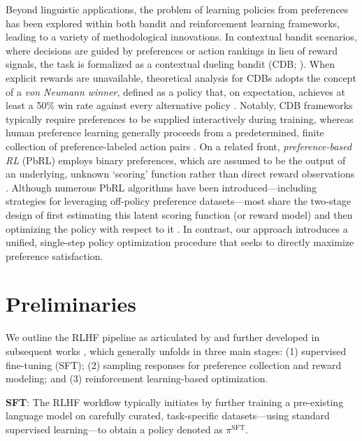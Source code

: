 Beyond linguistic applications, the problem of learning policies from preferences has been explored within both bandit and reinforcement learning frameworks, leading to a variety of methodological innovations. In contextual bandit scenarios, where decisions are guided by preferences or action rankings in lieu of reward signals, the task is formalized as a contextual dueling bandit (CDB; \cite{yue2012karmed,dudik2015contextual}). When explicit rewards are unavailable, theoretical analysis for CDBs adopts the concept of a \textit{von Neumann winner}, defined as a policy that, on expectation, achieves at least a 50\% win rate against every alternative policy \citep{dudik2015contextual}. Notably, CDB frameworks typically require preferences to be supplied interactively during training, whereas human preference learning generally proceeds from a predetermined, finite collection of preference-labeled action pairs \citep{yan2022human}. On a related front, \textit{preference-based RL} (PbRL) employs binary preferences, which are assumed to be the output of an underlying, unknown `scoring' function rather than direct reward observations \citep{BusaFekete2014,ruiz2023dueling}. Although numerous PbRL algorithms have been introduced—including strategies for leveraging off-policy preference datasets—most share the two-stage design of first estimating this latent scoring function (or reward model) and then optimizing the policy with respect to it \citep{jain2013learning,BusaFekete2014,christiano2017deep,sadigh2017active,kupcsik2018learning}. In contrast, our approach introduces a unified, single-step policy optimization procedure that seeks to directly maximize preference satisfaction.

\section{Preliminaries}\label{section:prelims}

We outline the RLHF pipeline as articulated by \citeauthor{ziegler2020finetuning} and further developed in subsequent works \citep{stiennon2022learning, bai2022training, ouyang2022training}, which generally unfolds in three main stages: (1) supervised fine-tuning (SFT); (2) sampling responses for preference collection and reward modeling; and (3) reinforcement learning-based optimization.

\textbf{SFT}: The RLHF workflow typically initiates by further training a pre-existing language model on carefully curated, task-specific datasets—using standard supervised learning—to obtain a policy denoted as $\pi^\text{SFT}$.

